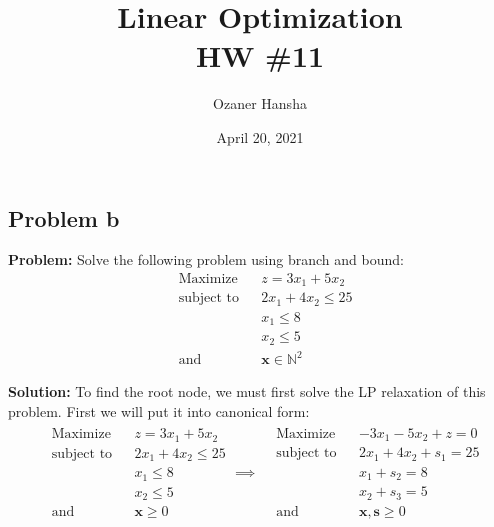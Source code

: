 \documentclass{article}
\renewcommand\vec{\mathbf}
\newcommand{\N}{\mathbb N}
\begin{document}
\title{Linear Optimization\\HW \#11}
\author{Ozaner Hansha}
\date{April 20, 2021}
\maketitle

\subsection*{Problem b}
\noindent\textbf{Problem:} Solve the following problem using branch and bound:
$$\begin{aligned}
  &{\text{Maximize}}
  &&z=3x_1+5x_2\\
  &{\text{subject to}}
  &&2x_1+4x_2\le25\\
  &
  &&x_1\le8\\
  &
  &&x_2\le 5\\
  &{\text{and}}
  &&\vec x\in\N^2
\end{aligned}$$
\bigskip

\noindent\textbf{Solution:} To find the root node, we must first solve the LP relaxation of this problem. First we will put it into canonical form:
\begin{align*}
  \begin{aligned}
    &{\text{Maximize}}
    &&z=3x_1+5x_2\\
    &{\text{subject to}}
    &&2x_1+4x_2\le25\\
    &
    &&x_1\le8\\
    &
    &&x_2\le5\\
    &{\text{and}}
    &&\vec x\ge 0
  \end{aligned}\implies
  \begin{aligned}
  &{\text{Maximize}}
  &&-3x_1-5x_2+z=0\\
  &{\text{subject to}}
  &&2x_1+4x_2+s_1=25\\
  &
  &&x_1+s_2=8\\
  &
  &&x_2+s_3=5\\
  &{\text{and}}
  &&\vec x,\vec s\ge 0
\end{aligned}
\end{align*}
\end{document}
